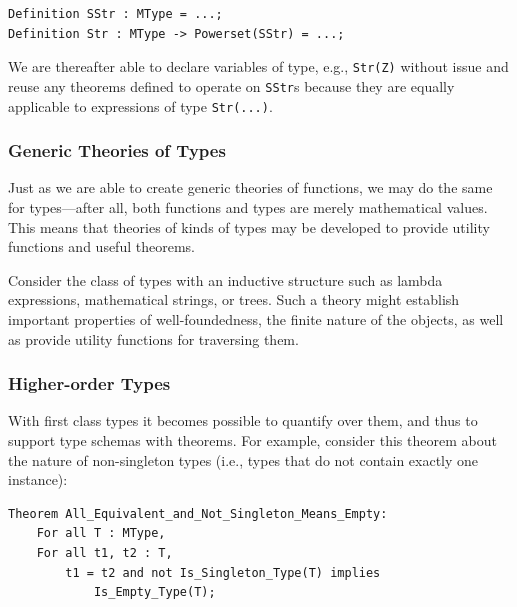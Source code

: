 \begin{lstlisting}
Definition SStr : MType = ...;
Definition Str : MType -> Powerset(SStr) = ...;
\end{lstlisting}

We are thereafter able to declare variables of type, e.g., \texttt{Str(Z)} without issue and reuse any theorems defined to operate on \texttt{SStr}s because they are equally applicable to expressions of type \texttt{Str(...)}.

		\subsubsection{Generic Theories of Types\label{genericTheoriesTypes}}

Just as we are able to create generic theories of functions, we may do the same for types---after all, both functions and types are merely mathematical values.  This means that theories of kinds of types may be developed to provide utility functions and useful theorems.

Consider the class of types with an inductive structure such as lambda expressions, mathematical strings, or trees.  Such a theory might establish important properties of well-foundedness, the finite nature of the objects, as well as provide utility functions for traversing them.

		\subsubsection{Higher-order Types\label{higherOrderTypes}}

With first class types it becomes possible to quantify over them, and thus to support type schemas with theorems.  For example, consider this theorem about the nature of non-singleton types (i.e., types that do not contain exactly one instance):

\begin{lstlisting}
Theorem All_Equivalent_and_Not_Singleton_Means_Empty:
	For all T : MType,
	For all t1, t2 : T,
		t1 = t2 and not Is_Singleton_Type(T) implies
			Is_Empty_Type(T);
\end{lstlisting}

